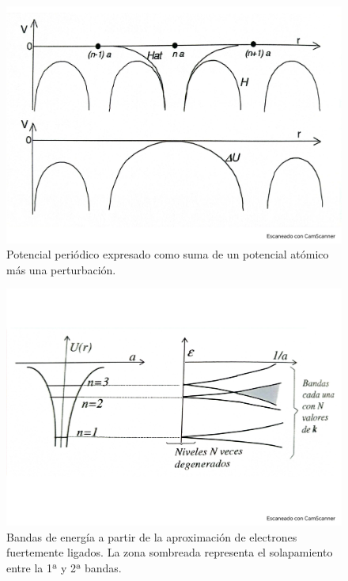 \begin{figure}[h!] \centering
    \includegraphics[scale=0.5]{Cuerpo/Ch_07/Fotos libro 5.pdf}
    \caption{Potencial periódico expresado como suma de un potencial atómico más una perturbación.}
    \label{Fig:07-05}
\end{figure}    
\begin{figure}[h!] \centering
    \includegraphics[scale=0.5]{Cuerpo/Ch_07/Fotos libro 6.pdf}
    \caption{Bandas de energía a partir de la aproximación de electrones fuertemente ligados. La zona sombreada representa el solapamiento entre la 1ª y 2ª bandas.}
    \label{Fig:07-06}
\end{figure}    

